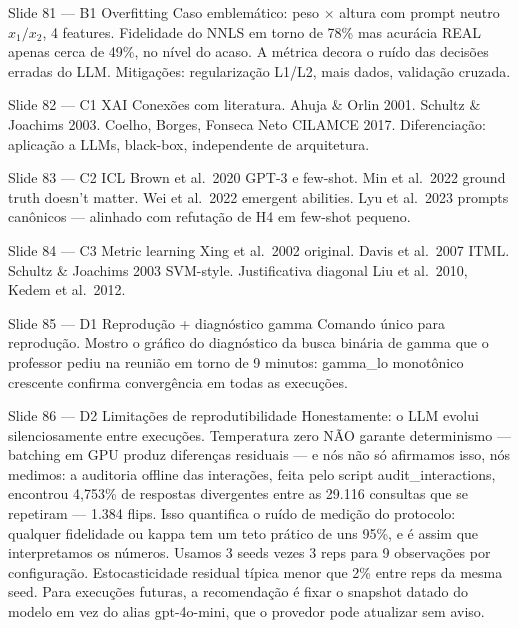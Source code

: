 \documentclass[aspectratio=169,10pt]{beamer}
\begin{document}
\begin{frame}{Slide 81 --- B1 Overfitting}
\footnotesize
Caso emblem\'atico: peso $\times$ altura com prompt neutro $x_1/x_2$, 4 features. Fidelidade do NNLS em torno de 78\% mas acur\'acia REAL apenas cerca de 49\%, no n\'ivel do acaso. A m\'etrica decora o ru\'ido das decis\~oes erradas do LLM. Mitiga\c{c}\~oes: regulariza\c{c}\~ao L1/L2, mais dados, valida\c{c}\~ao cruzada.
\end{frame}

\begin{frame}{Slide 82 --- C1 XAI}
\footnotesize
Conex\~oes com literatura. Ahuja \& Orlin 2001. Schultz \& Joachims 2003. Coelho, Borges, Fonseca Neto CILAMCE 2017. Diferencia\c{c}\~ao: aplica\c{c}\~ao a LLMs, black-box, independente de arquitetura.
\end{frame}

\begin{frame}{Slide 83 --- C2 ICL}
\footnotesize
Brown et al.\ 2020 GPT-3 e few-shot. Min et al.\ 2022 ground truth doesn't matter. Wei et al.\ 2022 emergent abilities. Lyu et al.\ 2023 prompts can\^onicos --- alinhado com refuta\c{c}\~ao de H4 em few-shot pequeno.
\end{frame}

\begin{frame}{Slide 84 --- C3 Metric learning}
\footnotesize
Xing et al.\ 2002 original. Davis et al.\ 2007 ITML. Schultz \& Joachims 2003 SVM-style. Justificativa diagonal Liu et al.\ 2010, Kedem et al.\ 2012.
\end{frame}

\begin{frame}{Slide 85 --- D1 Reprodu\c{c}\~ao + diagn\'ostico gamma}
\footnotesize
Comando \'unico para reprodu\c{c}\~ao. Mostro o gr\'afico do diagn\'ostico da busca bin\'aria de gamma que o professor pediu na reuni\~ao em torno de 9 minutos: gamma\_lo monot\^onico crescente confirma converg\^encia em todas as execu\c{c}\~oes.
\end{frame}

\begin{frame}{Slide 86 --- D2 Limita\c{c}\~oes de reprodutibilidade}
\footnotesize
Honestamente: o LLM evolui silenciosamente entre execu\c{c}\~oes. Temperatura zero N\~AO garante determinismo --- batching em GPU produz diferen\c{c}as residuais --- e n\'os n\~ao s\'o afirmamos isso, n\'os medimos: a auditoria offline das intera\c{c}\~oes, feita pelo script audit\_interactions, encontrou 4,753\% de respostas divergentes entre as 29.116 consultas que se repetiram --- 1.384 flips. Isso quantifica o ru\'ido de medi\c{c}\~ao do protocolo: qualquer fidelidade ou kappa tem um teto pr\'atico de uns 95\%, e \'e assim que interpretamos os n\'umeros. Usamos 3 seeds vezes 3 reps para 9 observa\c{c}\~oes por configura\c{c}\~ao. Estocasticidade residual t\'ipica menor que 2\% entre reps da mesma seed. Para execu\c{c}\~oes futuras, a recomenda\c{c}\~ao \'e fixar o snapshot datado do modelo em vez do alias gpt-4o-mini, que o provedor pode atualizar sem aviso.
\end{frame}
\end{document}
